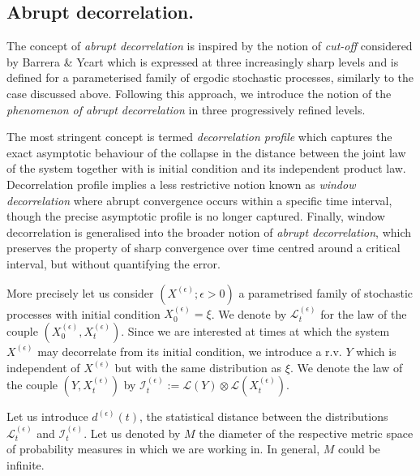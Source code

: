 \documentclass[12pt,thmsa]{article}
\begin{document}
\subsection{Abrupt decorrelation.}

The concept of {\it abrupt decorrelation}  is inspired  by  the notion of  {\it cut-off } considered by  Barrera \&  Ycart  \cite{BY} which is expressed at three increasingly sharp levels and is defined for a parameterised  family of ergodic stochastic processes, similarly to the case discussed above. Following this approach, we introduce the notion of the {\it phenomenon of abrupt decorrelation} in three progressively refined levels. 

The most stringent concept is termed {\it decorrelation profile } which 
captures the exact asymptotic behaviour  of the collapse in the distance between the joint law of the system together with is initial condition and its  independent product law.
Decorrelation profile  implies a less restrictive notion known as {\it window decorrelation} where abrupt convergence occurs within a specific time interval, though the precise asymptotic profile is no longer captured. Finally, window decorrelation is generalised into the broader notion of {\it abrupt decorrelation},  which preserves the property of sharp convergence over time centred around a critical interval, but without quantifying the error.

More precisely let us consider $(X^{(\epsilon)}; \epsilon>0)$ a parametrised family of stochastic processes with  initial condition $X^{(\epsilon)}_0=\xi$. We denote by $\mathcal{L}_t^{(\epsilon)}$ for the law of the couple $(X_0^{(\epsilon)}, X_t^{(\epsilon)})$.   Since we are interested at times at which the system  $X^{(\epsilon)}$ may decorrelate from its initial condition, we introduce a r.v. $Y$ which is independent of $X^{(\epsilon)}$ but with the same distribution as $\xi$. We denote the law of the couple $(Y, X_t^{(\epsilon)})$ by $\mathcal{I}_t^{(\epsilon)}:=\mathcal{L}(Y)\otimes\mathcal{L}(X_t^{(\epsilon)})$. 

Let us introduce $d^{(\epsilon)}(t)$, the statistical distance between the distributions $\mathcal{L}_t^{(\epsilon)}$ and $\mathcal{I}_t^{(\epsilon)}$. Let us denoted by $M$ the diameter of the respective metric space of probability measures in which we are working in. In general, $M$ could be infinite.
\end{document}
